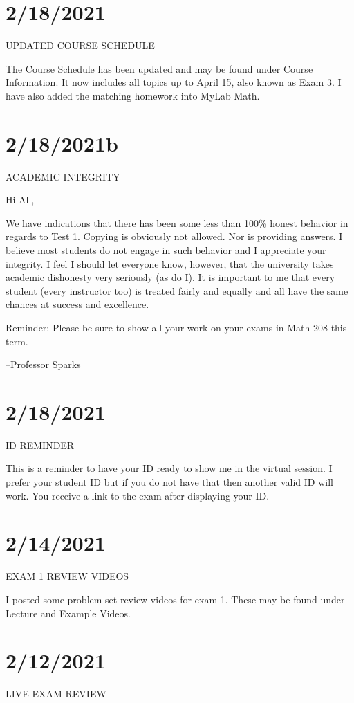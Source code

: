 \documentclass[]{article}
\begin{document}
	
\section*{2/18/2021}
UPDATED COURSE SCHEDULE

The Course Schedule has been updated and may be found under Course Information. It now includes all topics up to April 15, also known as Exam 3. I have also added the matching homework into MyLab Math.

	
\section*{2/18/2021b}
ACADEMIC INTEGRITY

Hi All,

We have indications that there has been some less than 100\% honest behavior in regards to Test 1. Copying is obviously not allowed. Nor is providing answers. I believe most students do not engage in such behavior and I appreciate your integrity. I feel I should let everyone know, however, that the university takes academic dishonesty very seriously (as do I). It is important to me that every student (every instructor too) is treated fairly and equally and all have the same chances at success and excellence.

Reminder: Please be sure to show all your work on your exams in Math 208 this term.

--Professor Sparks
	
\section*{2/18/2021}
ID REMINDER

This is a reminder to have your ID ready to show me in the virtual session. I prefer your student ID but if you do not have that then another valid ID will work. You receive a link to the exam after  displaying your ID.
	
\section*{2/14/2021}
EXAM 1 REVIEW VIDEOS

I posted some problem set review videos for exam 1. These may be found under Lecture and Example Videos.
	
\section*{2/12/2021}
LIVE EXAM REVIEW
\end{document}
